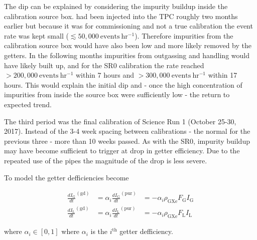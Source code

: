 The dip can be explained by considering the impurity buildup inside the calibration source box.  \rncal had been injected into the TPC
roughly two months earlier but because it was for commissioning and not a true calibration the event rate was kept small
($\lesssim 50,000\ \mathrm{events\ hr^{-1}}$).  Therefore
impurities from the calibration source box would have also been low and more likely removed by the getters.  In the following months
impurities from outgassing and handling would have likely built up, and for the SR0 calibration the rate reached
$> 200,000\ \mathrm{events\ hr^{-1}}$ within 7 hours and $> 300,000\ \mathrm{events\ hr^{-1}}$ within 17 hours.  This would explain the
initial dip and - once the high concentration of impurities from inside the source box were sufficiently low - the return to expected
trend.

The third period was the final \rncal calibration of Science Run 1 (October 25-30, 2017).  Instead of the 3-4 week spacing between
calibrations - the normal for the previous three - more than 10 weeks passed.  As with the SR0, impurity buildup may have become
sufficient to trigger at drop in getter efficiency.  Due to the repeated use of the pipes the magnitude of the drop is less severe.

To model the getter defficiencies 
become

\begin{subequations}
\begin{align}
\frac{dI_{\mathrm{G}}}{dt}^{(\mathrm{gd})} &= \alpha_i \frac{dI_{\mathrm{G}}}{dt}^{(\mathrm{pur})} &=
-\alpha_i \rho_{\mathrm{GXe}} F_{\mathrm{G}} I_{\mathrm{G}}
\label{eq:electron_lifetime_model_detector_effects_getter_gxe}
\\
\frac{dI_{\mathrm{L}}}{dt}^{(\mathrm{gd})} &= \alpha_i \frac{dI_{\mathrm{L}}}{dt}^{(\mathrm{pur})} &=
-\alpha_i \rho_{\mathrm{GXe}} F_{\mathrm{L}} I_{\mathrm{L}}
\label{eq:electron_lifetime_model_detector_effects_getter_lxe}
\end{align}
\end{subequations}

\noindent where $\alpha_i \in [0, 1]$ where $\alpha_i$ is the $i^{\mathrm{th}}$ getter defficiency.



